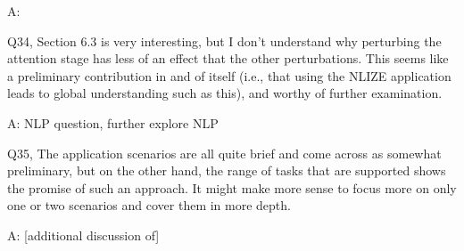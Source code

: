 A:

Q34, Section 6.3 is very interesting, but I don't understand why perturbing the attention stage has less of an effect that the other perturbations. This seems like a preliminary contribution in and of itself (i.e., that using the NLIZE application leads to global understanding such as this), and worthy of further examination.

A: NLP question, further explore NLP

Q35, The application scenarios are all quite brief and come across as somewhat preliminary, but on the other hand, the range of tasks that are supported shows the promise of such an approach. It might make more sense to focus more on only one or two scenarios and cover them in more depth.

A: [additional discussion of]
